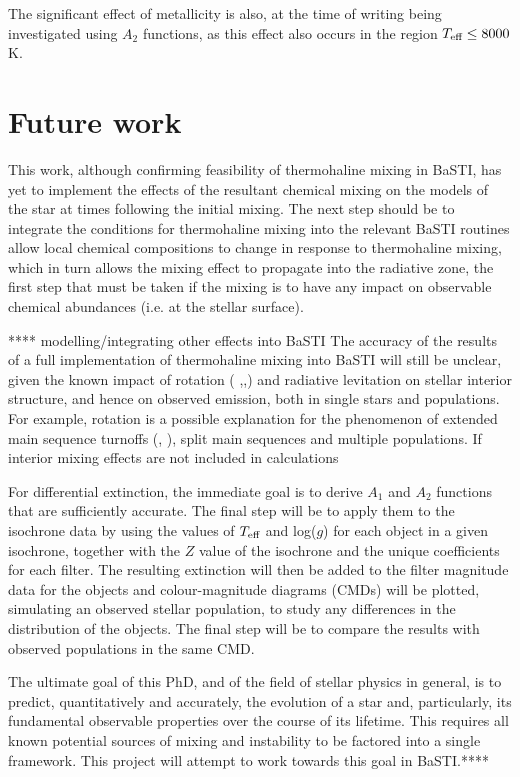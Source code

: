 \documentclass[12pt, a4paper]{report}
\begin{document}
The significant effect of metallicity is also, at the time of writing being investigated using $A_{2}$ functions, as this effect also occurs in the region $T_{\textnormal{eff}} \leq 8000$K.

\chapter{Future work}
This work, although confirming feasibility of thermohaline mixing in BaSTI, has yet to implement the effects of the resultant chemical mixing on the models of the star at times following the initial mixing. The next step should be to integrate the conditions for thermohaline mixing into the relevant BaSTI routines allow local chemical compositions to change in response to thermohaline mixing, which in turn allows the mixing effect to propagate into the radiative zone, the first step that must be taken if the mixing is to have any impact on observable chemical abundances (i.e. at the stellar surface).

**** modelling/integrating other effects into BaSTI
The accuracy of the results of a full implementation of thermohaline mixing into BaSTI will still be unclear, given the known impact of rotation (\cite{1963ApJ...138.1134C} \cite{1998A&A...334.1000M},\cite{2017A&A...606A..55M},\cite{2012A&A...537A.146E}) and radiative levitation \citep{2016A&A...592A..29M} on stellar interior structure, and hence on observed emission, both in single stars  and populations. For example, rotation is a possible explanation for the phenomenon of extended main sequence turnoffs (\cite{2015MNRAS.453.2070N}, \cite{2016MNRAS.460L..20B}), split main sequences and multiple populations. If interior mixing effects are not included in calculations

For differential extinction, the immediate goal is to derive $A_{1}$ and $A_{2}$ functions that are  sufficiently accurate. The final step will be to apply them to the isochrone data by using the values of $T_{\textnormal{eff}}$ and log($g$) for each object in a given isochrone, together with the $Z$ value of the isochrone and the unique coefficients for each filter. The resulting extinction will then be added to the filter magnitude data for the objects and colour-magnitude diagrams (CMDs) will be plotted, simulating an observed stellar population, to study any differences in the distribution of the objects. The final step will be to compare the results with observed populations in the same CMD.

The ultimate goal of this PhD, and of the field of stellar physics in general, is to predict, quantitatively and accurately, the evolution of a star and, particularly, its fundamental observable properties over the course of its lifetime. This requires all known potential sources of mixing and instability to be factored into a single framework. This project will attempt to work towards this goal in BaSTI.****
\end{document}

